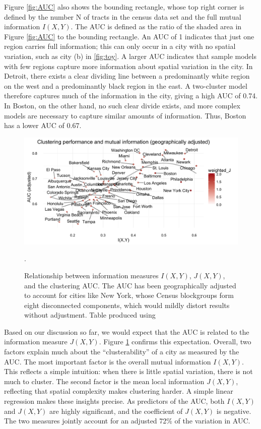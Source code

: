 		Figure \ref{fig:AUC} also shows the bounding rectangle, whose top right corner is defined by the number N of tracts in the census data set and the full mutual information $I(X,Y)$. The AUC is defined as the ratio of the shaded area in Figure \ref{fig:AUC} to the bounding rectangle. An AUC of 1 indicates that just one region carries full information; this can only occur in a city with no spatial variation, such as city (b) in \ref{fig:toy}. A larger AUC indicates that sample models with few regions capture more information about spatial variation in the city. In Detroit, there exists a clear dividing line between a predominantly white region on the west and a predominantly black region in the east. A two-cluster model therefore captures much of the information in the city, giving a high AUC of 0.74. In Boston, on the other hand, no such clear divide exists, and more complex models are necessary to capture similar amounts of information. Thus, Boston has a lower AUC of 0.67. 

		\begin{figure}
			\centering
			\includegraphics[width=\textwidth]{figs/info_performance_adjed.png}
			

			\caption{Relationship between information measures $I(X,Y)$, $J(X,Y)$, and the clustering AUC. The AUC has been geographically adjusted to account for cities like New York, whose Census blockgroups form eight disconnected components, which would mildly distort results without adjustment. Table produced using \cite{Marek2015}}.
			\label{fig:info_and_clusters}
		\end{figure}		

		Based on our discussion so far, we would expect that the AUC is related to the information measure $J(X,Y)$. Figure \ref{fig:info_and_clusters} confirms this expectation. Overall, two factors explain much about the ``clusterability'' of a city as measured by the AUC. The most important factor is the overall mutual information $I(X,Y)$. This reflects a simple intuition: when there is little spatial variation, there is not much to cluster. The second factor is the mean local information $J(X,Y)$, reflecting that spatial complexity makes clustering harder. A simple linear regression makes these insights precise. As predictors of the AUC, both $I(X,Y)$ and $J(X,Y)$ are highly significant, and the coefficient of $J(X,Y)$ is negative. The two measures jointly account for an adjusted 72\% of the variation in AUC. 